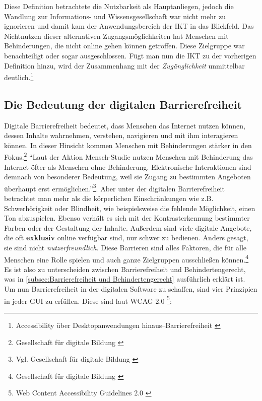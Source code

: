 Diese Definition betrachtete die Nutzbarkeit als Hauptanliegen, jedoch die Wandlung zur Informations- und Wissensgesellschaft war nicht mehr zu ignorieren und damit kam der Anwendungsbereich der \ac{IKT} in das Blickfeld. Das Nichtnutzen dieser alternativen Zugangsmöglichkeiten hat Menschen mit Behinderungen, die nicht online gehen können getroffen. Diese Zielgruppe war benachteiligt oder sogar ausgeschlossen. Fügt man nun die \ac{IKT} zu der vorherigen Definition hinzu, wird der Zusammenhang mit der \textit{Zugänglichkeit} unmittelbar deutlich.\footnote{Accessibility über Desktopanwendungen hinaus–Barrierefreiheit \cite{buhler2017accessibility}}

\subsection{Die Bedeutung der digitalen Barrierefreiheit}
\label{subsec: Die Bedeutung der digitalen Barrierefreiheit}

Digitale Barrierefreiheit bedeutet, dass Menschen das Internet nutzen können, dessen Inhalte wahrnehmen, verstehen, navigieren und mit ihm interagieren können. In dieser Hinsicht kommen Menschen mit Behinderungen stärker in den Fokus.\footnote{Gesellschaft für digitale Bildung \cite{GFDB}} "`Laut der Aktion Mensch-Studie nutzen Menschen mit Behinderung das Internet öfter als Menschen ohne Behinderung. Elektronische Interaktionen sind demnach von besonderer Bedeutung, weil sie Zugang zu bestimmten Angeboten überhaupt erst ermöglichen."'\footnote{Vgl. Gesellschaft für digitale Bildung \cite{GFDB}}. Aber unter der digitalen Barrierefreiheit betrachtet man mehr als die körperlichen Einschränkungen wie z.B. Schwerhörigkeit oder Blindheit, wie beispielsweise die fehlende Möglichkeit, einen Ton abzuspielen. Ebenso verhält es sich mit der Kontrasterkennung bestimmter Farben oder der Gestaltung der Inhalte. Außerdem sind viele digitale Angebote, die oft \textbf{exklusiv} online verfügbar sind, nur schwer zu bedienen. Anders gesagt, sie sind nicht \textit{nutzerfreundlich}. Diese Barrieren sind alles Faktoren, die für alle Menschen eine Rolle spielen und auch ganze Zielgruppen ausschließen können.\footnote{Gesellschaft für digitale Bildung \cite{GFDB}} Es ist also zu unterscheiden zwischen Barrierefreiheit und Behindertengerecht, was in \cref{subsec:Barrierefreiheit und Behindertengerecht} ausführlich erklärt ist. Um nun Barrierefreiheit in der digitalen Software zu schaffen, sind vier Prinzipien in jeder \ac{GUI} zu erfüllen. Diese sind laut \ac{WCAG} 2.0 \footnote{Web Content Accessibility Guidelines 2.0 \cite{caldwell2008web}}:

